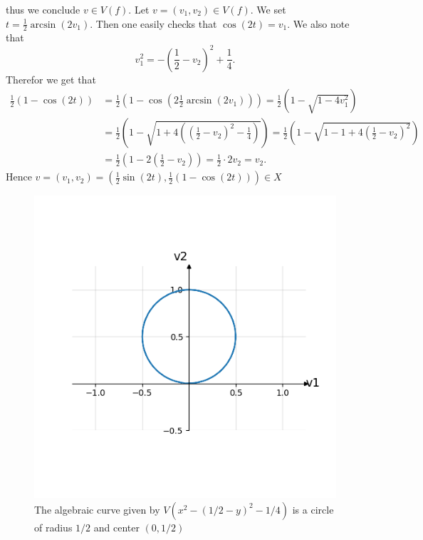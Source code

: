 \begin{example}
\begin{enumerate}
        thus we conclude $v\in V(f).$ Let $v=(v_1,v_2)\in V(f)$. We set $t=\frac{1}{2}\arcsin(2v_1)$. Then one easily checks that $\cos(2t)=v_1$. We also note that 
        $$v_1^2=-\left(\frac{1}{2}-v_2\right)^2+\frac{1}{4}.$$
        Therefor we get that
        \begin{align*}
        \frac{1}{2}(1-\cos(2t))&=\frac{1}{2}\left(1-\cos\left(2\frac{1}{2}\arcsin(2v_1)\right)\right) = \frac{1}{2}\left(1-\sqrt{1-4v_1^2}\right)\\
        &=\frac{1}{2}\left(1 -\sqrt{1+4\left(\left(\frac{1}{2}-v_2\right)^2-\frac{1}{4} \right)} \right)=\frac{1}{2}\left(1-\sqrt{1-1+4\left(\frac{1}{2}-v_2\right)^2}\right)\\
        &= \frac{1}{2}\left(1-2\left(\frac{1}{2}-v_2\right) \right)=\frac{1}{2}\cdot 2v_2=v_2.
        \end{align*}
        \noindent Hence $v=(v_1,v_2)=\left(\frac{1}{2}\sin\left(2t\right),\frac{1}{2}\left(1-\cos\left(2t\right)\right) \right)\in X$
        \newpage
        \begin{figure}[h]
            \centering
            \includegraphics[scale = 1]{figures/AlgebraicCurveEx3.png}
            \caption{The algebraic curve given by $V(x^2-(1/2-y)^2-1/4)$ is a circle of radius $1/2$ and center $(0,1/2)$}
            \label{fig:AlgebraicCurveEx}
        \end{figure}
    \end{enumerate}
\end{example}

